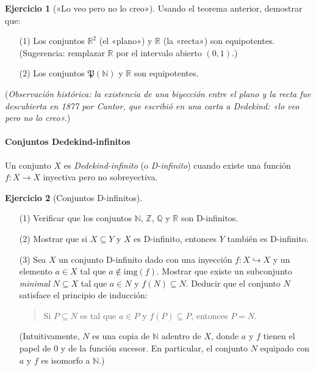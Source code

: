 \documentclass[a4paper,12pt]{book}
\newcommand{\N}{\mathbb{N}}
\newcommand{\R}{\mathbb{R}}
\def\Pow{\mathfrak{P}}
\def\img{\mathrm{img}}
\def\into{\hookrightarrow}
\def\Pow{\mathfrak{P}}
\def\img{\mathrm{img}}
\def\into{\hookrightarrow}
\def\Z{\mathbb{Z}}
\def\Q{\mathbb{Q}}
\theoremstyle{definition}
\newtheorem{ejercicio}{Ejercicio}
\begin{document}
	
	\begin{ejercicio}[«Lo veo pero no lo creo»]
		Usando el teorema anterior, demostrar que:
		\begin{enumerate}
			\item[(1)] Los conjuntos $\R^2$ (el «plano») y $\R$ (la «recta»)
			son equipotentes.\\
			(Sugerencia: remplazar $\R$ por el intervalo abierto $(0,1)$.)
			\item[(2)] Los conjuntos $\Pow(\N)$ y $\R$ son equipotentes.
		\end{enumerate}
		(\emph{Observación histórica: la existencia de una biyección entre
			el plano y la recta fue descubierta en 1877 por Cantor, que
			escribió en una carta a Dedekind: «lo veo pero no lo creo».})
	\end{ejercicio}
	
	\paragraph*{Conjuntos Dedekind-infinitos}
	Un conjunto $X$ es \emph{Dedekind-infinito} (o \emph{D-infinito})
	cuando existe una función $f:X\to X$ inyectiva pero no sobreyectiva.
	
	\begin{ejercicio}[Conjuntos D-infinitos]~\par
		\begin{enumerate}
			\item[(1)] Verificar que los conjuntos $\N$, $\Z$, $\Q$ y $\R$ son
			D-infinitos.
			\item[(2)] Mostrar que si $X\subseteq Y$ y $X$ es D-infinito,
			entonces $Y$ también es D-infinito.
			\item[(3)] Sea $X$ un conjunto D-infinito dado con una inyección
			$f:X\into X$ y un elemento $a\in X$ tal que $a\notin\img(f)$.
			Mostrar que existe un subconjunto \emph{minimal} $N\subseteq X$
			tal que $a\in N$ y $f(N)\subseteq N$.
			Deducir que el conjunto $N$ satisface el principio de inducción:
			\begin{quote}
				Si $P\subseteq N$ es tal que $a\in P$ y
				$f(P)\subseteq P$, entonces $P=N$.
			\end{quote}
			(Intuitivamente, $N$ es una copia de $\N$ adentro de $X$, donde
			$a$ y $f$ tienen el papel de $0$ y de la función sucesor.
			En particular, el conjunto $N$ equipado con $a$ y $f$ es isomorfo
			a $\N$.)
		\end{enumerate}
	\end{ejercicio}
	
\end{document}
